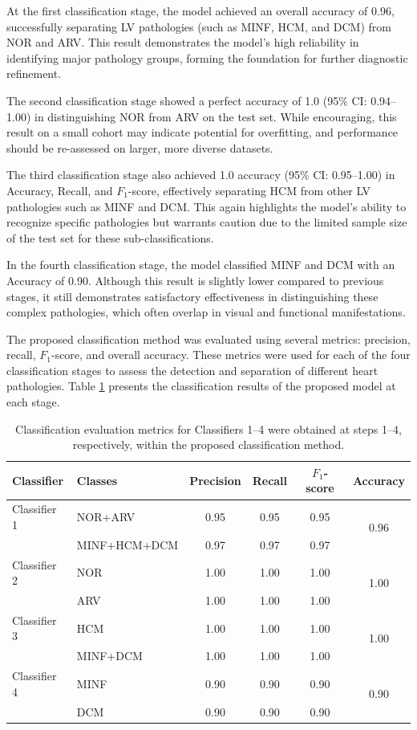 \documentclass[fleqn,10pt]{wlscirep}
\begin{document}
At the first classification stage, the model achieved an overall accuracy of 0.96, successfully separating LV pathologies (such as MINF, HCM, and DCM) from NOR and ARV. This result demonstrates the model's high reliability in identifying major pathology groups, forming the foundation for further diagnostic refinement.

The second classification stage showed a perfect accuracy of 1.0 (95\% CI: 0.94--1.00) in distinguishing NOR from ARV on the test set. While encouraging, this result on a small cohort may indicate potential for overfitting, and performance should be re-assessed on larger, more diverse datasets.

The third classification stage also achieved 1.0 accuracy (95\% CI: 0.95--1.00) in Accuracy, Recall, and \({F_1}\)-score, effectively separating HCM from other LV pathologies such as MINF and DCM. This again highlights the model's ability to recognize specific pathologies but warrants caution due to the limited sample size of the test set for these sub-classifications.

In the fourth classification stage, the model classified MINF and DCM with an Accuracy of 0.90. Although this result is slightly lower compared to previous stages, it still demonstrates satisfactory effectiveness in distinguishing these complex pathologies, which often overlap in visual and functional manifestations.

The proposed classification method was evaluated using several metrics: precision, recall, \({F_1}\)-score, and overall accuracy. These metrics were used for each of the four classification stages to assess the detection and separation of different heart pathologies. Table \ref{tab:cascade_classification_metrics} presents the classification results of the proposed model at each stage.

\begin{table}[ht]
\centering
\caption{Classification evaluation metrics for Classifiers 1--4 were obtained at steps 1--4, respectively, within the proposed classification method.}
\label{tab:cascade_classification_metrics}
\begin{tabular}{l lcccc}
\toprule
\textbf{Classifier} & \textbf{Classes} & \textbf{Precision} & \textbf{Recall} & \textbf{\({F_1}\)-score} & \textbf{Accuracy} \\
\midrule
Classifier 1 & NOR+ARV & 0.95 & 0.95 & 0.95 & \multirow{2}{*}{0.96} \\
 & MINF+HCM+DCM & 0.97 & 0.97 & 0.97 &  \\
\midrule
Classifier 2 & NOR & 1.00 & 1.00 & 1.00 & \multirow{2}{*}{1.00} \\
 & ARV & 1.00 & 1.00 & 1.00 &  \\
\midrule
Classifier 3 & HCM & 1.00 & 1.00 & 1.00 & \multirow{2}{*}{1.00} \\
 & MINF+DCM & 1.00 & 1.00 & 1.00 &  \\
\midrule
Classifier 4 & MINF & 0.90 & 0.90 & 0.90 & \multirow{2}{*}{0.90} \\
 & DCM & 0.90 & 0.90 & 0.90 &  \\
\bottomrule
\end{tabular}
\end{table}
\end{document}
